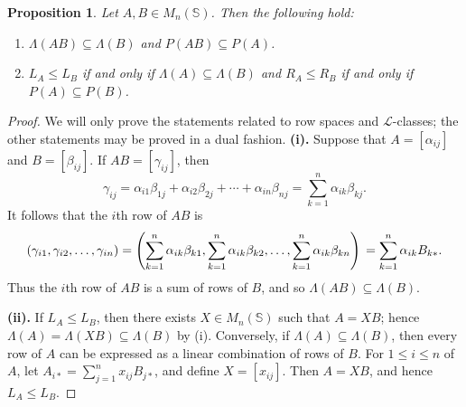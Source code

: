\documentclass[11pt]{article}
\newtheorem{prop}[thm]{Proposition}
\numberwithin{equation}{section}
\renewcommand{\L}{\mathscr{L}}
\newcommand{\RowS}{\Lambda}
\newcommand{\ColS}{P}
\begin{document}
\begin{prop}
  Let $A, B \in M_n(\mathbb{S})$. Then the following hold:
  \begin{enumerate}[label={\rm (\roman*)}]
    \item 
      $\RowS(AB) \subseteq \RowS(B)$ and $\ColS(AB) \subseteq \ColS(A)$.
    \item
      $L_A \leq L_B$ if and only if $\RowS(A) \subseteq \RowS(B)$ and $R_A \leq
      R_B$ if and only if $\ColS(A) \subseteq \ColS(B)$.
  \end{enumerate}
\end{prop}
\begin{proof}
  We will only prove the statements related to row spaces and $\L$-classes; the
  other statements may be proved in a dual fashion.
  \noindent \textbf{(i).}
  Suppose that $A = [\alpha_{ij}]$ and $B = [\beta_{ij}]$. If 
  $AB = [\gamma_{ij}]$, then 
  \[
  \gamma_{ij} = \alpha_{i1} \beta_{1j} + \alpha_{i2}\beta_{2j} 
                + \cdots + \alpha_{in}\beta_{nj}
              = \sum_{k = 1} ^ {n} \alpha_{ik}\beta_{kj}.
  \]
  It follows that the $i$th row of $AB$ is 
  \[
  (\gamma_{i1}, \gamma_{i2}, \ldots, \gamma_{in})
   =  \left (\sum_{k = 1} ^ {n} \alpha_{ik}\beta_{k1},
     \sum_{k = 1} ^ {n} \alpha_{ik}\beta_{k2},
     \ldots, 
     \sum_{k = 1} ^ {n} \alpha_{ik}\beta_{kn}\right) \\
    =
    \sum_{k = 1} ^ {n} 
    \alpha_{ik}B_{k*}.
  \]
  Thus the $i$th row of $AB$ is a sum of rows of $B$, and so $\RowS(AB)
  \subseteq \RowS(B)$.

  \bigskip
  
  \noindent \textbf{(ii).}
  If $L_A \leq L_B$, then there exists $X \in M_n(\mathbb{S})$ such that $A =
  XB$; hence $\RowS(A) = \RowS(XB) \subseteq \RowS(B)$ by (i).  Conversely, if
  $\RowS(A) \subseteq \RowS(B)$, then every row of $A$ can be expressed as a
  linear combination of rows of $B$. For $1 \leq i \leq n$ of $A$, let $A_{i*} =
  \sum_{j = 1}^{n}x_{ij}B_{j*}$, and define $X = [x_{ij}]$. Then $A = XB$, and
  hence $L_A \leq L_B$. 
\end{proof}
\end{document}
